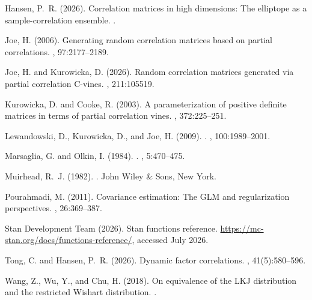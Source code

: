 \documentclass[12pt,english]{article}
\theoremstyle{plain} %
\theoremstyle{definition} %
\theoremstyle{remark} %
\begin{document}
\begin{thebibliography}{}
Hansen, P.~R. (2026).
\newblock Correlation matrices in high dimensions: The elliptope as a
  sample-correlation ensemble.
.

Joe, H. (2006).
\newblock Generating random correlation matrices based on partial correlations.
, 97:2177--2189.

Joe, H. and Kurowicka, D. (2026).
\newblock Random correlation matrices generated via partial correlation
  {C}-vines.
, 211:105519.

Kurowicka, D. and Cooke, R. (2003).
\newblock A parameterization of positive definite matrices in terms of partial
  correlation vines.
, 372:225--251.

Lewandowski, D., Kurowicka, D., and Joe, H. (2009).
.
, 100:1989--2001.

Marsaglia, G. and Olkin, I. (1984).
.
,
  5:470--475.

Muirhead, R.~J. (1982).
.
\newblock John Wiley \& Sons, New York.

Pourahmadi, M. (2011).
\newblock Covariance estimation: The {GLM} and regularization perspectives.
, 26:369--387.

{Stan Development Team} (2026).
\newblock Stan functions reference.
\newblock \url{https://mc-stan.org/docs/functions-reference/}, accessed July
  2026.

Tong, C. and Hansen, P.~R. (2026).
\newblock Dynamic factor correlations.
, 41(5):580--596.

Wang, Z., Wu, Y., and Chu, H. (2018).
\newblock On equivalence of the {LKJ} distribution and the restricted {W}ishart
  distribution.
.

\end{thebibliography}
\end{document}
